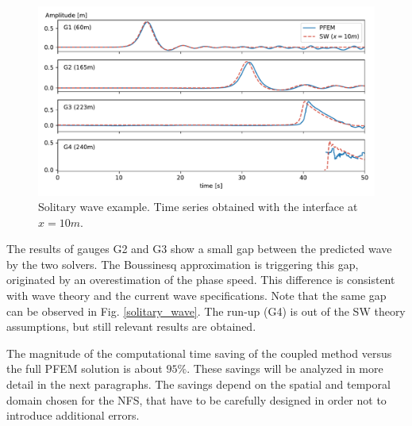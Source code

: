 \begin{figure} [htb]
    \centering
    \includegraphics[width=\textwidth]{img/coupling/solitary_wave_propagation.pdf}
    \caption{Solitary wave example. Time series obtained with the interface at $x=10m$.}
    \label{solitary_wave_propagation}
\end{figure}

The results of gauges G2 and G3 show a small gap between the predicted wave by the two solvers. The Boussinesq approximation is triggering this gap, originated by an overestimation of the phase speed. This difference is consistent with wave theory and the current wave specifications. Note that the same gap can be observed in Fig. \ref{solitary_wave}.
The run-up (G4) is out of the SW theory assumptions, but still relevant results are obtained.

The magnitude of the computational time saving of the coupled method versus the full PFEM solution is about $95\%$. These savings will be analyzed in more detail in the next paragraphs. The savings depend on the spatial and temporal domain chosen for the NFS, that have to be carefully designed in order not to introduce additional errors.




